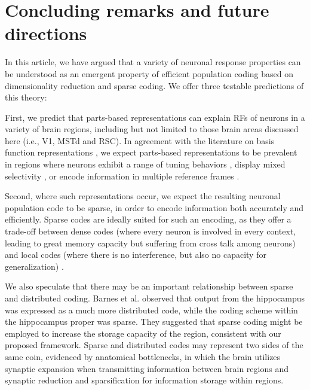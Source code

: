 \section{Concluding remarks and future directions}
\label{sec:conclusion}

In this article,
we have argued that a variety of neuronal response properties can
be understood as an emergent property of efficient population coding
based on dimensionality reduction and sparse coding.
We offer three testable predictions of this theory:

First, we predict that parts-based representations can explain
\acp{RF} of neurons in a variety of brain regions,
including but not limited to those brain areas discussed here (i.e., V1, MSTd and RSC). In agreement with the literature on basis function representations
\citep{PougetSejnowski1997,PougetSnyder2000,Poggio1990},
we expect parts-based representations
to be prevalent in regions where neurons
exhibit a range of tuning behaviors \citep{Beyeler2016},
display mixed selectivity \citep{Fusi2016,Eichenbaum2017},
or encode information in multiple reference frames \citep{AlexanderNitz2015,Rounds2016}.

Second, where such representations occur, we expect the resulting
neuronal population code to be sparse,
in order to encode information both accurately and efficiently.
Sparse codes are ideally suited for such an encoding, as they offer
a trade-off between 
dense codes (where every neuron is involved in every context,
leading to great memory capacity but suffering from cross talk among neurons)
and local codes (where there is no interference, 
but also no capacity for generalization) \citep{Spanne2015417}.

We also speculate that there may be an important relationship between sparse and distributed coding. Barnes et al. \citep{barnes1990chapter} observed that output from the hippocampus was expressed as a much more
distributed code, while the coding scheme within the hippocampus proper was sparse.
They suggested that sparse coding might be employed to increase the storage capacity of the region, consistent with our proposed framework.
Sparse and distributed codes may represent two sides of the same coin, evidenced by anatomical bottlenecks, in which the brain utilizes synaptic expansion when transmitting information between brain regions and synaptic reduction and sparsification for information storage within regions. 

